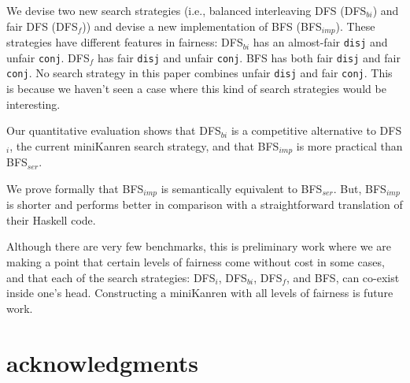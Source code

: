 \documentclass[acmlarge, review=true]{acmart}
\newcommand{\conj}{\texttt{conj}}
\newcommand{\disj}{\texttt{disj}}
\newcommand{\DFSi }[0]{DFS$_{i}$}
\newcommand{\DFSf }[0]{DFS$_{f}$}
\newcommand{\DFSbi}[0]{DFS$_{bi}$}
\newcommand{\BFS}[0]{BFS}
\newcommand{\BFSser}[0]{BFS$_{ser}$}
\newcommand{\BFSimp}[0]{BFS$_{imp}$}
\begin{document}
We devise two new search strategies (i.e., balanced interleaving DFS 
(\DFSbi{}) and fair DFS (\DFSf{})) and devise a new 
implementation of \BFS{} (\BFSimp{}). These strategies have different features 
in fairness: \DFSbi{} has an almost-fair \disj{} and unfair \conj{}. 
\DFSf{} has fair \disj{} and unfair \conj{}. \BFS{} has both fair
\disj{} and fair \conj{}. No search strategy in this paper combines unfair 
\disj{} and fair \conj{}. This is because we haven't seen a case where this 
kind of search strategies would be interesting.

Our quantitative evaluation shows that \DFSbi{} is a competitive 
alternative to \DFSi{}, the current miniKanren search strategy,
and that \BFSimp{} is more practical than \BFSser{}.

We prove formally that \BFSimp{} is semantically equivalent to \BFSser{}. But, 
\BFSimp{} is shorter and performs better in comparison with a straightforward 
translation of their Haskell code.

Although there are very few benchmarks, this is preliminary work where we are 
making a point that certain levels of fairness come without cost in some cases, 
and that each of the search strategies: \DFSi, \DFSbi, \DFSf, and 
\BFS, can co-exist inside one's head. Constructing a miniKanren with all 
levels of fairness is future work.

\section*{acknowledgments}



\end{document}
